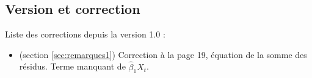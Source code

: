 \subsection*{Version et correction}
Liste des corrections depuis la version 1.0 :
\begin{itemize}
\item (section \ref{sec:remarques1}) Correction à la page 19, équation de la somme des résidus. Terme manquant de $\hat{\beta}_1 X_t$.
\end{itemize}